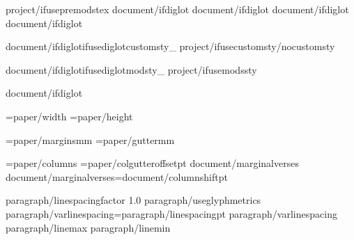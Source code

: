 


{project/ifusepremodstex}
{document/ifdiglot}\diglottrue
{document/ifdiglot}\diglotcolumns
{document/ifdiglot}
{document/ifdiglot}


{document/ifdiglot}{ifusediglotcustomsty_}
{project/ifusecustomsty}{/nocustomsty}

{document/ifdiglot}{ifusediglotmodsty_} %
{project/ifusemodssty} %

{document/ifdiglot}

\PaperWidth={paper/width}
\PaperHeight={paper/height}

\MarginUnit={paper/margins}mm
\def\TopMarginFactor{{{paper/topmarginfactor}}}
\def\BottomMarginFactor{{{paper/bottommarginfactor}}}
\def\SideMarginFactor{{{paper/sidemarginfactor}}}
\BindingGutter={paper/gutter}mm

\BodyColumns={paper/columns}
\def\ColumnGutterFactor{{{document/colgutterfactor}}}
\ColumnGutterRuleSkip={paper/colgutteroffset}pt
{document/marginalverses}
{document/marginalverses}\columnshift={document/columnshift}pt
\def\PageFullFactor{{0.66}}

\def\LineSpaceBase{{{paragraph/linespacebase}}}
\def\LineSpacingFactor{L_}{{{paragraph/linespacingfactor}}}
\def\VerticalSpaceFactor{L_}{{1.0}}
{paragraph/useglyphmetrics}
{paragraph/varlinespacing}\baselineskip={paragraph/linespacing}pt {paragraph/varlinespacing} {paragraph/linemax} {paragraph/linemin}

